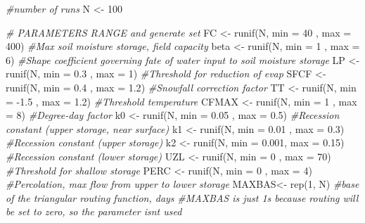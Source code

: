 \documentclass[
]{book}
\newenvironment{Shaded}{\begin{snugshade}}{\end{snugshade}}
\newcommand{\AttributeTok}[1]{\textcolor[rgb]{0.77,0.63,0.00}{#1}}
\newcommand{\CommentTok}[1]{\textcolor[rgb]{0.56,0.35,0.01}{\textit{#1}}}
\newcommand{\DecValTok}[1]{\textcolor[rgb]{0.00,0.00,0.81}{#1}}
\newcommand{\FloatTok}[1]{\textcolor[rgb]{0.00,0.00,0.81}{#1}}
\newcommand{\FunctionTok}[1]{\textcolor[rgb]{0.00,0.00,0.00}{#1}}
\newcommand{\NormalTok}[1]{#1}
\newcommand{\OtherTok}[1]{\textcolor[rgb]{0.56,0.35,0.01}{#1}}
\newcommand{\SpecialCharTok}[1]{\textcolor[rgb]{0.00,0.00,0.00}{#1}}
\begin{document}
\begin{Shaded}
\begin{Highlighting}[]
\CommentTok{\#number of runs}
\NormalTok{N }\OtherTok{\textless{}{-}} \DecValTok{100}

\CommentTok{\# PARAMETERS RANGE and generate set}
\NormalTok{FC    }\OtherTok{\textless{}{-}} \FunctionTok{runif}\NormalTok{(N, }\AttributeTok{min =} \DecValTok{40}\NormalTok{   , }\AttributeTok{max =} \DecValTok{400}\NormalTok{)  }\CommentTok{\#Max soil moisture storage, field capacity}
\NormalTok{beta  }\OtherTok{\textless{}{-}} \FunctionTok{runif}\NormalTok{(N, }\AttributeTok{min =} \DecValTok{1}\NormalTok{    , }\AttributeTok{max =} \DecValTok{6}\NormalTok{)    }\CommentTok{\#Shape coefficient governing fate of water input to soil moisture storage}
\NormalTok{LP    }\OtherTok{\textless{}{-}} \FunctionTok{runif}\NormalTok{(N, }\AttributeTok{min =} \FloatTok{0.3}\NormalTok{   , }\AttributeTok{max =} \DecValTok{1}\NormalTok{)    }\CommentTok{\#Threshold for reduction of evap}
\NormalTok{SFCF  }\OtherTok{\textless{}{-}} \FunctionTok{runif}\NormalTok{(N, }\AttributeTok{min =} \FloatTok{0.4}\NormalTok{  , }\AttributeTok{max =} \FloatTok{1.2}\NormalTok{)  }\CommentTok{\#Snowfall correction factor}
\NormalTok{TT    }\OtherTok{\textless{}{-}} \FunctionTok{runif}\NormalTok{(N, }\AttributeTok{min =} \SpecialCharTok{{-}}\FloatTok{1.5}\NormalTok{ , }\AttributeTok{max =} \FloatTok{1.2}\NormalTok{)  }\CommentTok{\#Threshold temperature}
\NormalTok{CFMAX }\OtherTok{\textless{}{-}} \FunctionTok{runif}\NormalTok{(N, }\AttributeTok{min =} \DecValTok{1}\NormalTok{    , }\AttributeTok{max =} \DecValTok{8}\NormalTok{)    }\CommentTok{\#Degree{-}day factor}
\NormalTok{k0    }\OtherTok{\textless{}{-}} \FunctionTok{runif}\NormalTok{(N, }\AttributeTok{min =} \FloatTok{0.05}\NormalTok{ , }\AttributeTok{max =} \FloatTok{0.5}\NormalTok{)  }\CommentTok{\#Recession constant (upper storage, near surface)}
\NormalTok{k1    }\OtherTok{\textless{}{-}} \FunctionTok{runif}\NormalTok{(N, }\AttributeTok{min =} \FloatTok{0.01}\NormalTok{ , }\AttributeTok{max =} \FloatTok{0.3}\NormalTok{)  }\CommentTok{\#Recession constant (upper storage)}
\NormalTok{k2    }\OtherTok{\textless{}{-}} \FunctionTok{runif}\NormalTok{(N, }\AttributeTok{min =} \FloatTok{0.001}\NormalTok{, }\AttributeTok{max =} \FloatTok{0.15}\NormalTok{) }\CommentTok{\#Recession constant (lower storage)}
\NormalTok{UZL   }\OtherTok{\textless{}{-}} \FunctionTok{runif}\NormalTok{(N, }\AttributeTok{min =} \DecValTok{0}\NormalTok{    , }\AttributeTok{max =} \DecValTok{70}\NormalTok{)   }\CommentTok{\#Threshold for shallow storage}
\NormalTok{PERC  }\OtherTok{\textless{}{-}} \FunctionTok{runif}\NormalTok{(N, }\AttributeTok{min =} \DecValTok{0}\NormalTok{    , }\AttributeTok{max =} \DecValTok{4}\NormalTok{)    }\CommentTok{\#Percolation, max flow from upper to lower storage}
\NormalTok{MAXBAS}\OtherTok{\textless{}{-}} \FunctionTok{rep}\NormalTok{(}\DecValTok{1}\NormalTok{, N)   }\CommentTok{\#base of the triangular routing function, days}
\CommentTok{\#MAXBAS is just 1\textquotesingle{}s because routing will be set to zero, so the parameter isn\textquotesingle{}t used}


\end{Highlighting}
\end{Shaded}
\end{document}
